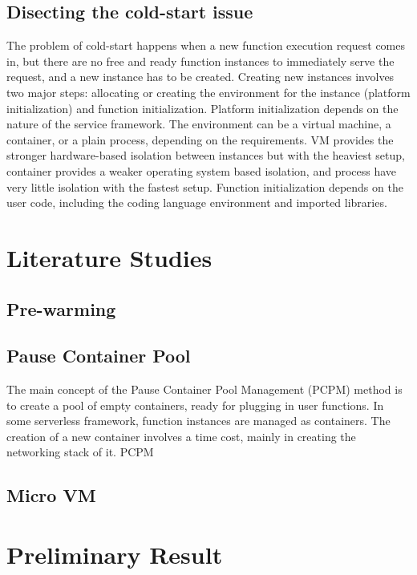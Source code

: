 \documentclass[conference]{IEEEtran}
\begin{document}
\subsection{Disecting the cold-start issue}
The problem of cold-start happens when a new function execution request comes in, but there are no free and ready function instances to immediately serve the request, and a new instance has to be created. Creating new instances involves two major steps: allocating or creating the environment for the instance (platform initialization) and function initialization. Platform initialization depends on the nature of the service framework. The environment can be a virtual machine, a container, or a plain process, depending on the requirements. VM provides the stronger hardware-based isolation between instances but with the heaviest setup, container provides a weaker operating system based isolation, and process have very little isolation with the fastest setup. Function initialization depends on the user code, including the coding language environment and imported libraries. 

\section{Literature Studies}

\subsection{Pre-warming}

\subsection{Pause Container Pool}
The main concept of the Pause Container Pool Management (PCPM) method is to create a pool of empty containers, ready for plugging in user functions. In some serverless framework, function instances are managed as containers. The creation of a new container involves a time cost, mainly in creating the networking stack of it. PCPM 

\subsection{Micro VM}

\section{Preliminary Result}
\end{document}
